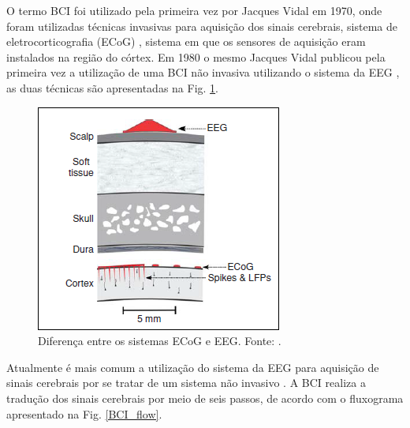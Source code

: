 O termo BCI foi utilizado pela primeira vez por Jacques Vidal em 1970, onde foram utilizadas técnicas invasivas para aquisição dos sinais cerebrais, sistema de eletrocorticografia (ECoG) \cite{BCIWolpaw}, sistema em que os sensores de aquisição eram instalados na região do córtex. Em 1980 o mesmo Jacques Vidal publicou pela primeira vez a utilização de uma BCI não invasiva utilizando o sistema da EEG \cite{CristophBCI}, as duas técnicas são apresentadas na Fig. \ref{ECoGeEEG}.
\pagebreak


\begin{figure}[h]
	\centering
	\includegraphics[keepaspectratio=true,scale=1.0]{figuras/sistemas_de_aquisicao.PNG}
	\caption{Diferença entre os sistemas ECoG e EEG. Fonte: \cite{BCIWolpaw}.}
	\label{ECoGeEEG}
\end{figure}

Atualmente é mais comum a utilização do sistema da EEG para aquisição de sinais cerebrais por se tratar de um sistema não invasivo \cite{CristophBCI}. A BCI realiza a tradução dos sinais cerebrais por meio de seis passos, de acordo com o fluxograma apresentado na Fig. \ref{BCI_flow}.

